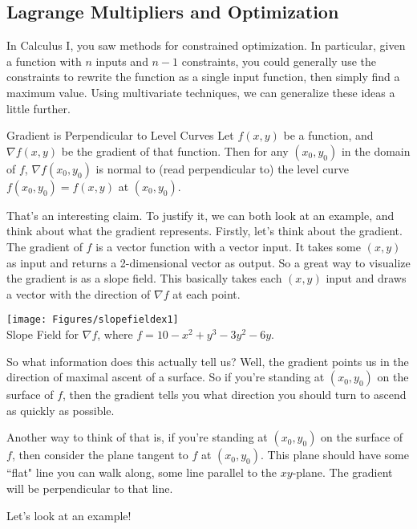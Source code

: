 
\subsection{Lagrange Multipliers and Optimization}
In Calculus I, you saw methods for constrained optimization. In particular, given a function with $n$ inputs and $n-1$ constraints, you could generally use the constraints to rewrite the function as a single input function, then simply find a maximum value. Using multivariate techniques, we can generalize these ideas a little further.

\begin{claim}{Gradient is Perpendicular to Level Curves}
Let $f(x,y)$ be a function, and $\nabla f(x,y)$ be the gradient of that function. Then for any $(x_0,y_0)$ in the domain of $f$, $\nabla f(x_0,y_0)$ is normal to (read perpendicular to) the level curve $f(x_0,y_0)=f(x,y)$ at $(x_0, y_0)$.
\end{claim}

That's an interesting claim. To justify it, we can both look at an example, and think about what the gradient represents. Firstly, let's think about the gradient. The gradient of $f$ is a vector function with a vector input. It takes some $(x,y)$ as input and returns a 2-dimensional vector as output. So a great way to visualize the gradient is as a slope field. This basically takes each $(x,y)$ input and draws a vector with the direction of $\nabla f$ at each point.

\vspace{1em}
\begin{center}
\texttt{[image: Figures/slopefieldex1]}
\\ Slope Field for $\nabla f$, where $f=10-x^2+y^3-3y^2-6y$.
\end{center}
\vspace{1em}

So what information does this actually tell us? Well, the gradient points us in the direction of maximal ascent of a surface. So if you're standing at $(x_0,y_0)$ on the surface of $f$, then the gradient tells you what direction you should turn to ascend as quickly as possible.

Another way to think of that is, if you're standing at $(x_0,y_0)$ on the surface of $f$, then consider the plane tangent to $f$ at $(x_0,y_0)$. This plane should have some ``flat" line you can walk along, some line parallel to the $xy$-plane. The gradient will be perpendicular to that line.

Let's look at an example!

